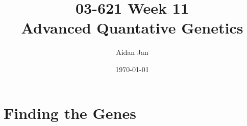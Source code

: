 \documentclass[10pt]{article}
\title{03-621 Week 11 \\ \large{Advanced Quantative Genetics}}
\author{Aidan Jan}
\date{\today}
\begin{document}
\maketitle

\section*{Finding the Genes}
\end{document}
